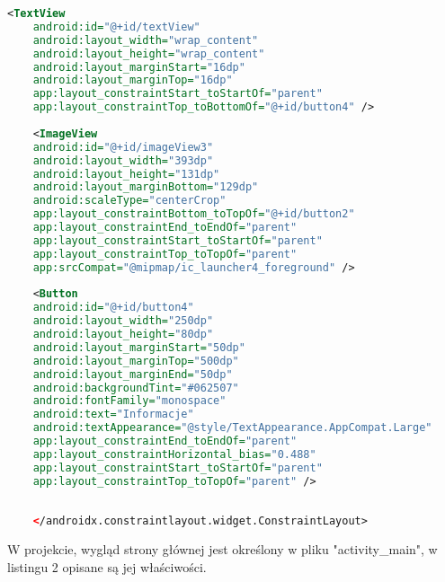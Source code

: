 \begin{lstlisting}[caption=Activity\_main, label={lst:kod.xml}, language=XML]
	<TextView
	android:id="@+id/textView"
	android:layout_width="wrap_content"
	android:layout_height="wrap_content"
	android:layout_marginStart="16dp"
	android:layout_marginTop="16dp"
	app:layout_constraintStart_toStartOf="parent"
	app:layout_constraintTop_toBottomOf="@+id/button4" />
	
	<ImageView
	android:id="@+id/imageView3"
	android:layout_width="393dp"
	android:layout_height="131dp"
	android:layout_marginBottom="129dp"
	android:scaleType="centerCrop"
	app:layout_constraintBottom_toTopOf="@+id/button2"
	app:layout_constraintEnd_toEndOf="parent"
	app:layout_constraintStart_toStartOf="parent"
	app:layout_constraintTop_toTopOf="parent"
	app:srcCompat="@mipmap/ic_launcher4_foreground" />
	
	<Button
	android:id="@+id/button4"
	android:layout_width="250dp"
	android:layout_height="80dp"
	android:layout_marginStart="50dp"
	android:layout_marginTop="500dp"
	android:layout_marginEnd="50dp"
	android:backgroundTint="#062507"
	android:fontFamily="monospace"
	android:text="Informacje"
	android:textAppearance="@style/TextAppearance.AppCompat.Large"
	app:layout_constraintEnd_toEndOf="parent"
	app:layout_constraintHorizontal_bias="0.488"
	app:layout_constraintStart_toStartOf="parent"
	app:layout_constraintTop_toTopOf="parent" />
	
	
	</androidx.constraintlayout.widget.ConstraintLayout>
\end{lstlisting}
\hspace{0.60cm} W projekcie, wygląd strony głównej jest określony w pliku "activity\_main", w listingu 2 opisane są jej właściwości.
